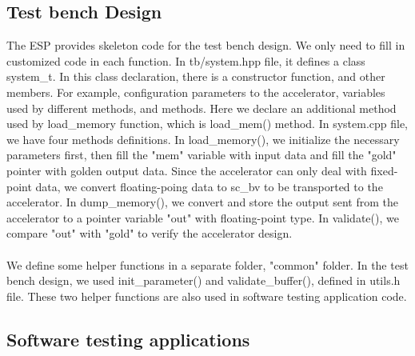 \documentclass{sig-alternate}
\begin{document}
\subsection{Test bench Design}
 The ESP provides skeleton code for the test bench design. We only need to fill in customized code in each function. In tb/system.hpp file, it defines a class system\_t. In this class declaration, there is a constructor function, and other members. For example, configuration parameters to the accelerator, variables used by different methods, and methods. Here we declare an additional method used by load\_memory function, which is load\_mem() method. In system.cpp file, we have four methods definitions. In load\_memory(), we initialize the necessary parameters first, then fill the "mem" variable with input data and fill the "gold" pointer with golden output data. Since the accelerator can only deal with fixed-point data, we convert floating-poing data to sc\_bv to be transported to the accelerator. In dump\_memory(), we convert and store the output sent from the accelerator to a pointer variable "out" with floating-point type. In validate(), we compare "out" with "gold" to verify the accelerator design. \\
 \\
 We define some helper functions in a separate folder, "common" folder. In the test bench design, we used init\_parameter() and validate\_buffer(), defined in utils.h file. These two helper functions are also used in software testing application code.\\

\subsection{Software testing applications}
\end{document}
